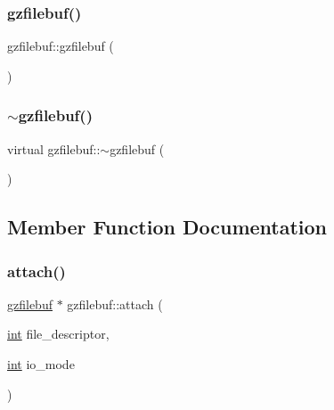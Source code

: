 \subsubsection{\texorpdfstring{gzfilebuf()}{gzfilebuf()}\hspace{0.1cm}{\footnotesize\ttfamily [2/2]}}
{\footnotesize\ttfamily gzfilebuf\+::gzfilebuf (\begin{DoxyParamCaption}{ }\end{DoxyParamCaption})}

\mbox{\label{classgzfilebuf_acb95da35cfe68e16fc85cac62453451d}} 
\subsubsection{\texorpdfstring{$\sim$gzfilebuf()}{~gzfilebuf()}\hspace{0.1cm}{\footnotesize\ttfamily [2/2]}}
{\footnotesize\ttfamily virtual gzfilebuf\+::$\sim$gzfilebuf (\begin{DoxyParamCaption}{ }\end{DoxyParamCaption})\hspace{0.3cm}{\ttfamily [virtual]}}



\subsection{Member Function Documentation}
\mbox{\label{classgzfilebuf_a3ececdeaa35a8b606182cc23c9908891}} 
\subsubsection{\texorpdfstring{attach()}{attach()}\hspace{0.1cm}{\footnotesize\ttfamily [1/2]}}
{\footnotesize\ttfamily \mbox{\hyperlink{classgzfilebuf}{gzfilebuf}} $\ast$ gzfilebuf\+::attach (\begin{DoxyParamCaption}\item[{\mbox{\hyperlink{ioapi_8h_a787fa3cf048117ba7123753c1e74fcd6}{int}}}]{file\+\_\+descriptor,  }\item[{\mbox{\hyperlink{ioapi_8h_a787fa3cf048117ba7123753c1e74fcd6}{int}}}]{io\+\_\+mode }\end{DoxyParamCaption})}

